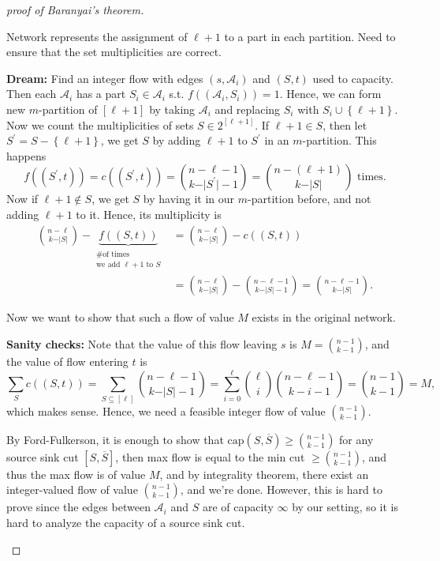 \begin{proof}[proof of Baranyai's theorem]
\begin{itemize}
            Network represents the assignment of \(\ell + 1\) to a part in each partition. Need to ensure that the set multiplicities are correct. 
            
            \textbf{Dream:} Find an integer flow with edges \((s, \mathcal{A}_i)\) and \((S, t)\) used to capacity. Then each \(\mathcal{A}_i\) has a part \(S_i \in \mathcal{A}_i\) s.t. \(f((\mathcal{A}_i, S_i)) = 1\). Hence, we can form new \(m\)-partition of \([\ell + 1]\) by taking \(\mathcal{A}_i\) and replacing \(S_i\) with \(S_i \cup \left\{ \ell + 1 \right\} \). Now we count the multiplicities of sets \(S \in 2^{[\ell + 1]}\). If \(\ell + 1 \in S\), then let \(S^{\prime} = S - \left\{ \ell + 1 \right\} \), we get \(S\) by adding \(\ell + 1\) to \(S^{\prime} \) in an \(m\)-partition. This happens 
            \[
                f((S^{\prime}, t)) = c((S^{\prime} , t)) = \binom{n - \ell - 1}{k - \vert S^{\prime}  \vert - 1} = \binom{n - (\ell + 1)}{k - \vert S \vert } \text{ times}. 
            \]                  
            Now if \(\ell + 1 \notin S\), we get \(S\) by having it in our \(m\)-partition before, and not adding \(\ell + 1\) to it. Hence, its multiplicity is 
            \begin{align*}
               \binom{n - \ell}{k - \vert S \vert } - \underbrace{f((S, t))}_{\substack{\text{\# of times} \\ \text{we add }  \ell + 1 \text{ to } S}} &= \binom{n - \ell}{k - \vert S \vert } - c((S, t)) \\
               &= \binom{n - \ell}{k - \vert S \vert } - \binom{n - \ell - 1}{k - \vert S \vert - 1} = \binom{n - \ell - 1}{k - \vert S \vert }.
            \end{align*}   

            Now we want to show that such a flow of value \(M\) exists in the original network.
            
            \textbf{Sanity checks:} Note that the value of this flow leaving \(s\) is \(M = \binom{n - 1}{k - 1}\), and the value of flow entering \(t\) is 
            \[
                \sum_{S} c((S, t)) = \sum_{S \subseteq [\ell]} \binom{n - \ell - 1}{k - \vert S \vert - 1} = \sum_{i=0}^{\ell } \binom{\ell}{i} \binom{n - \ell - 1}{k - i - 1} = \binom{n - 1}{k - 1} = M,    
            \]   
            which makes sense. Hence, we need a feasible integer flow of value \(\binom{n - 1}{k - 1}\).
            
            By Ford-Fulkerson, it is enough to show that \(\mathrm{cap}(S, \overline{S}) \ge \binom{n - 1}{k - 1} \) for any source sink cut \([S, \overline{S}]\), then max flow is equal to the min cut \(\ge \binom{n - 1}{k - 1}\), and thus the max flow is of value \(M\), and by integrality theorem, there exist an integer-valued flow of value \(\binom{n - 1}{k - 1}\), and we're done. However, this is hard to prove since the edges between \(\mathcal{A}_i\) and \(S\) are of capacity \(\infty\) by our setting, so it is hard to analyze the capacity of a source sink cut.   


\end{itemize}
\end{proof}
